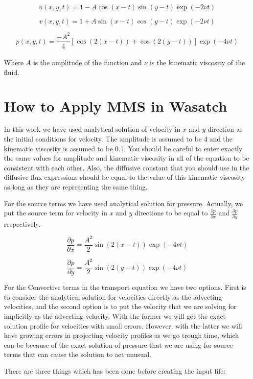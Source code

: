 \documentclass[10pt] {article}
\begin{document}
$$u(x,y,t)=1-A\cos(x-t)\sin(y-t)\exp(-2\nu t)$$

$$v(x,y,t)=1+A\sin(x-t)\cos(y-t)\exp(-2\nu t)$$

$$p(x,y,t)=\frac{-A^{2}}{4}\left[\cos(2(x-t))+\cos(2(y-t))\right]\exp(-4\nu t)$$\\
Where $A$ is the amplitude of the function and $\nu$ is the kinematic viscosity of the fluid.

\section{How to Apply MMS in Wasatch}

In this work we have used analytical solution of velocity in $x$ and $y$ direction as the initial conditions for velocity. The amplitude is assumed to be 4 and the kinematic viscosity is assumed to be 0.1. You should be careful to enter exactly the same values for amplitude and kinematic viscosity in all of the equation to be consistent with each other. Also, the diffusive constant that you should use in the diffusive flux expressions should be equal to the value of this kinematic viscosity as long as they are representing the same thing.

For the source terms we have used analytical solution for pressure. Actually, we put the source term for velocity in $x$ and $y$ directions to be equal to $\frac{\partial p}{\partial x}$ and $\frac{\partial p}{\partial y}$ respectively.

$$\frac{\partial p}{\partial x}=\frac{A^{2}}{2}\sin(2(x-t))\exp(-4\nu t)$$

$$\frac{\partial p}{\partial y}=\frac{A^{2}}{2}\sin(2(y-t))\exp(-4\nu t)$$

For the Convective terms in the transport equation we have two options. First is to consider the analytical solution for velocities directly as the advecting velocities, and the second option is to put the velocity that we are solving for implicitly as the advecting velocity. With the former we will get the exact solution profile for velocities with small errors. However, with the latter we will have growing errors in projecting velocity profiles as we go trough time, which can be because of the exact solution of pressure that we are using for source terms that can cause the solution to act unusual.

There are three things which has been done before creating the input file:
\end{document}
